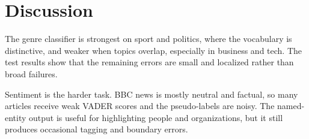 \section{Discussion}
\label{sec:discussion}

The genre classifier is strongest on sport and politics, where the vocabulary is distinctive, and weaker when topics overlap, especially in business and tech. The test results show that the remaining errors are small and localized rather than broad failures.

Sentiment is the harder task. BBC news is mostly neutral and factual, so many articles receive weak VADER scores and the pseudo-labels are noisy. The named-entity output is useful for highlighting people and organizations, but it still produces occasional tagging and boundary errors.
